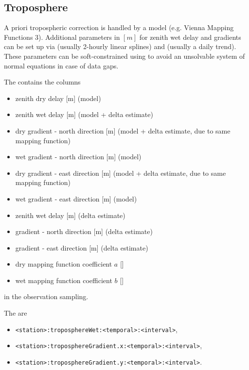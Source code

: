 \subsection{Troposphere}\label{gnssParametrizationType:troposphere}
A priori tropospheric correction is handled by a  model (e.g. Vienna Mapping Functions 3).
Additional parameters in $[m]$ for zenith wet delay and gradients can be set up via
 (usually 2-hourly linear splines)
and  (usually a daily trend).
These parameters can be soft-constrained using
to avoid an unsolvable system of normal equations in case of data gaps.

The  contains the columns
\begin{itemize}
\item zenith dry delay [m] (model)
\item zenith wet delay [m] (model + delta estimate)
\item dry gradient - north direction [m] (model + delta estimate, due to same mapping function)
\item wet gradient - north direction [m] (model)
\item dry gradient - east direction [m] (model + delta estimate, due to same mapping function)
\item wet gradient - east direction [m] (model)
\item zenith wet delay [m] (delta estimate)
\item gradient - north direction [m] (delta estimate)
\item gradient - east direction [m] (delta estimate)
\item dry mapping function coefficient $a$ []
\item wet mapping function coefficient $b$ []
\end{itemize}
in the observation sampling.

The  are
\begin{itemize}
\item \verb|<station>:troposphereWet:<temporal>:<interval>|,
\item \verb|<station>:troposphereGradient.x:<temporal>:<interval>|,
\item \verb|<station>:troposphereGradient.y:<temporal>:<interval>|.
\end{itemize}


